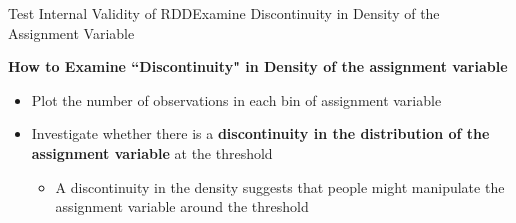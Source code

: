 \documentclass[hyperref={pdfpagelabels=false}]{beamer}
\begin{document}
\begin{frame}{Test Internal Validity of RDD}{Examine Discontinuity in Density of the Assignment Variable}
	
	\textbf{How to Examine ``Discontinuity" in Density of the assignment variable}
	
	\begin{itemize}
		\vspace{0.2cm}	
		\item Plot the number of observations in each bin of assignment variable
		\vspace{0.1cm}	
		\item Investigate whether there is a \textbf{discontinuity in the distribution of the assignment variable} at the threshold
		\vspace{0.2cm}	
			\begin{itemize}
		\item A discontinuity in the density suggests that people might manipulate the assignment variable around the threshold
			\end{itemize}
		
	\end{itemize}
\end{frame}
\end{document}
